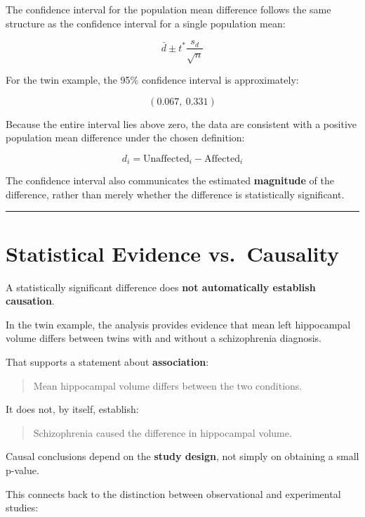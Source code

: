 \documentclass[
  letterpaper,
  DIV=11,
  numbers=noendperiod]{scrreprt}
\begin{document}
The confidence interval for the population mean difference follows the
same structure as the confidence interval for a single population mean:

\[
\boxed{
\bar{d}
\pm
t^*
\frac{s_d}{\sqrt{n}}
}
\]

For the twin example, the 95\% confidence interval is approximately:

\[
(0.067,\ 0.331)
\]

Because the entire interval lies above zero, the data are consistent
with a positive population mean difference under the chosen definition:

\[
d_i
=
\text{Unaffected}_i
-
\text{Affected}_i
\]

The confidence interval also communicates the estimated
\textbf{magnitude} of the difference, rather than merely whether the
difference is statistically significant.

\begin{center}\rule{0.5\linewidth}{0.5pt}\end{center}


\chapter{Statistical Evidence
vs.~Causality}\label{statistical-evidence-vs.-causality}

A statistically significant difference does \textbf{not automatically
establish causation}.

In the twin example, the analysis provides evidence that mean left
hippocampal volume differs between twins with and without a
schizophrenia diagnosis.

That supports a statement about \textbf{association}:

\begin{quote}
Mean hippocampal volume differs between the two conditions.
\end{quote}

It does not, by itself, establish:

\begin{quote}
Schizophrenia caused the difference in hippocampal volume.
\end{quote}

Causal conclusions depend on the \textbf{study design}, not simply on
obtaining a small p-value.

This connects back to the distinction between observational and
experimental studies:
\end{document}
